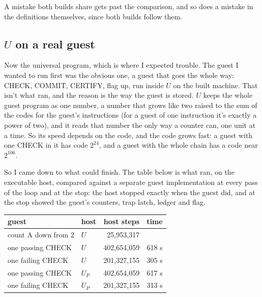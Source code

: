 \documentclass[11pt,twoside]{article}
\theoremstyle{thielethm}
\theoremstyle{thieledef}
\theoremstyle{thieledef}
\theoremstyle{thieledef}
\theoremstyle{thielethm}
\theoremstyle{thieleobs}
\theoremstyle{thielethm}
\begin{document}
A mistake both builds share gets past the comparison, and so does a mistake in the definitions
themselves, since both builds follow them.

\subsection{\texorpdfstring{$U$}{U} on a real guest}

Now the universal program, which is where I expected trouble. The guest I wanted to run first was
the obvious one, a guest that goes the whole way: CHECK, COMMIT, CERTIFY, flag up, run inside $U$ on
the built machine. That isn't what ran, and the reason is the way the guest is stored. $U$ keeps the whole guest program as one number,
a number that grows like two raised to the sum of the codes for the guest's instructions (for a
guest of one instruction it's exactly a power of two), and it reads that number
the only way a counter can, one unit at a time. So its speed depends on the code, and the code grows
fast: a guest with one CHECK in it has code $2^{24}$, and a guest with the whole chain has a code
near $2^{106}$.

So I came down to what could finish. The table below is what ran, on the executable host, compared against a separate
guest implementation at every pass of the loop and at the stop: the host stopped exactly when the guest
did, and at the stop showed the guest's counters, trap latch, ledger and flag.

\begin{center}
\begin{tabular}{@{}llrr@{}}
guest & host & host steps & time \\ \hline
count A down from 2 & $U$ & 25,953,317 & \\
one passing CHECK & $U$ & 402,654,059 & 618 s \\
one failing CHECK & $U$ & 201,327,155 & 305 s \\
one passing CHECK & $U_P$ & 402,654,059 & 617 s \\
one failing CHECK & $U_P$ & 201,327,155 & 313 s \\
\end{tabular}
\end{center}
\end{document}
